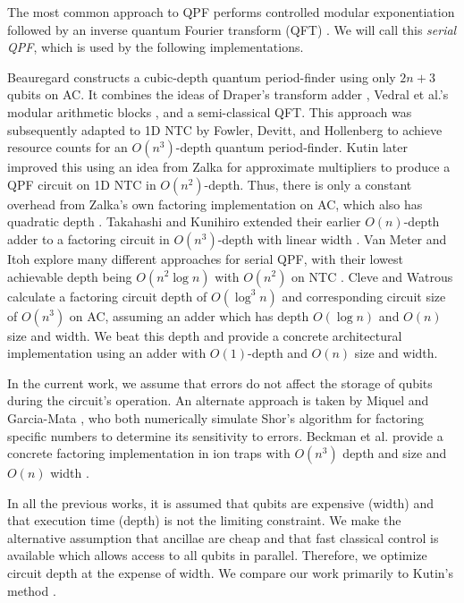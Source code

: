 The most common approach to QPF performs controlled
modular exponentiation followed by an inverse quantum Fourier transform
(QFT) \cite{Nielsen2000}. We will call this \emph{serial QPF}, which is
used by the following implementations.

Beauregard \cite{Beauregard2002}
constructs a cubic-depth quantum period-finder using only $2n+3$ qubits on
\textsf{AC}.
It combines the ideas of Draper's transform adder \cite{Draper2000},
Vedral et al.'s modular arithmetic blocks \cite{Vedral1996}, and a
semi-classical QFT.
This approach was subsequently adapted to \textsf{1D NTC} by Fowler, Devitt,
and Hollenberg
\cite{Fowler2004} to achieve resource counts for an $O(n^3)$-depth
quantum period-finder. Kutin \cite{Kutin2006} later improved this using
an idea from Zalka for approximate multipliers to produce a QPF circuit on
\textsf{1D NTC}
in $O(n^2)$-depth. Thus, there is only a constant overhead from
Zalka's own factoring implementation on \textsf{AC}, which also has
quadratic depth \cite{Zalka1998}.
Takahashi and Kunihiro extended their earlier $O(n)$-depth adder to a factoring
circuit in $O(n^3)$-depth with linear width \cite{Takahashi2006}.
Van Meter and Itoh explore many different approaches for serial QPF,
with their lowest achievable depth being $O(n^2\log n)$ with
$O(n^2)$ on \textsf{NTC} \cite{VanMeter2005}. Cleve and Watrous
calculate a factoring circuit depth of $O(\log^3 n)$ and corresponding
circuit size of $O(n^3)$ on \textsf{AC},
assuming an adder which has depth $O(\log n)$ and
$O(n)$ size and width. We beat this depth and provide a concrete
architectural implementation using an adder with $O(1)$-depth and $O(n)$
size and width.

In the current work, we assume that errors do not affect the storage of qubits
during the circuit's operation. An alternate approach is taken by
Miquel \cite{Miquel1996} and Garcia-Mata \cite{GarciaMata2007}, who both
numerically simulate Shor's algorithm for factoring specific
numbers to determine its sensitivity to errors. Beckman et al. provide a
concrete factoring implementation in ion traps with $O(n^3)$ depth and size and
$O(n)$ width \cite{Beckman1996}.

In all the previous works,
it is assumed that qubits are expensive (width) and that
execution time (depth) is not the limiting constraint.
We make the alternative assumption that ancillae are cheap and that fast classical control
is available which allows access to all qubits in parallel.
Therefore, we optimize circuit depth at the expense of width.
We compare our work primarily to Kutin's method \cite{Kutin2006}.

